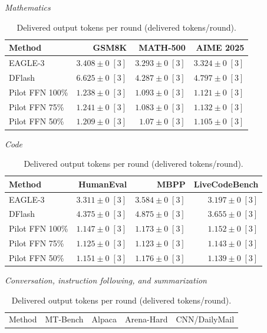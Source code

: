 \begin{table}[!htp]
\centering\small
\setlength{\tabcolsep}{3pt}
\caption{Delivered output tokens per round (delivered tokens/round).}
\label{tab:appendix-metric-returned-round-none}
\textit{Mathematics}\par\smallskip
\begin{tabular}{@{}>{\raggedright\arraybackslash}p{3.7cm}rrr@{}}
\toprule
Method & GSM8K & MATH-500 & AIME 2025 \\
\midrule
EAGLE-3 & \(3.408 \pm 0\;[3]\) & \(3.293 \pm 0\;[3]\) & \(3.324 \pm 0\;[3]\) \\
DFlash & \(\mathbf{6.625} \pm 0\;[3]\) & \(\mathbf{4.287} \pm 0\;[3]\) & \(\mathbf{4.797} \pm 0\;[3]\) \\
Pilot FFN 100\% & \(1.238 \pm 0\;[3]\) & \(1.093 \pm 0\;[3]\) & \(1.121 \pm 0\;[3]\) \\
Pilot FFN 75\% & \(1.241 \pm 0\;[3]\) & \(1.083 \pm 0\;[3]\) & \(1.132 \pm 0\;[3]\) \\
Pilot FFN 50\% & \(1.209 \pm 0\;[3]\) & \(1.07 \pm 0\;[3]\) & \(1.105 \pm 0\;[3]\) \\
\bottomrule
\end{tabular}\par\medskip
\textit{Code}\par\smallskip
\begin{tabular}{@{}>{\raggedright\arraybackslash}p{3.7cm}rrr@{}}
\toprule
Method & HumanEval & MBPP & LiveCodeBench \\
\midrule
EAGLE-3 & \(3.311 \pm 0\;[3]\) & \(3.584 \pm 0\;[3]\) & \(3.197 \pm 0\;[3]\) \\
DFlash & \(\mathbf{4.375} \pm 0\;[3]\) & \(\mathbf{4.875} \pm 0\;[3]\) & \(\mathbf{3.655} \pm 0\;[3]\) \\
Pilot FFN 100\% & \(1.147 \pm 0\;[3]\) & \(1.173 \pm 0\;[3]\) & \(1.152 \pm 0\;[3]\) \\
Pilot FFN 75\% & \(1.125 \pm 0\;[3]\) & \(1.123 \pm 0\;[3]\) & \(1.143 \pm 0\;[3]\) \\
Pilot FFN 50\% & \(1.151 \pm 0\;[3]\) & \(1.176 \pm 0\;[3]\) & \(1.139 \pm 0\;[3]\) \\
\bottomrule
\end{tabular}\par\medskip
\textit{Conversation, instruction following, and summarization}\par\smallskip
\begin{tabular}{@{}>{\raggedright\arraybackslash}p{3.7cm}rrrr@{}}
\toprule
Method & MT-Bench & Alpaca & Arena-Hard & CNN/DailyMail \\

\end{tabular}
\end{table}
